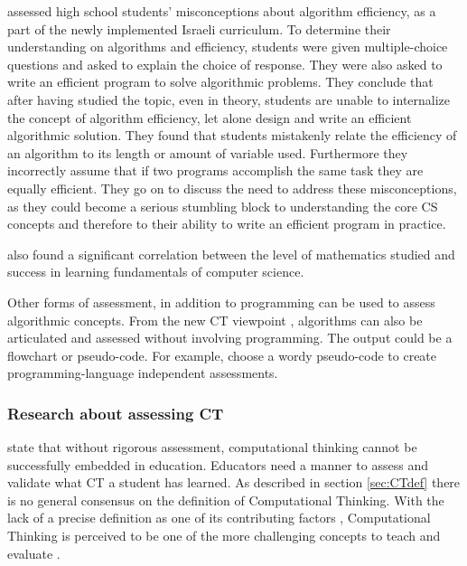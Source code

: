  assessed high school students' misconceptions about algorithm efficiency, as a part of the newly implemented Israeli curriculum. To determine their understanding on algorithms and efficiency, students were given multiple-choice questions and asked to explain the choice of response. They were also asked to write an efficient program to solve algorithmic problems. They conclude that after having studied the topic, even in theory, students are unable to internalize the concept of algorithm efficiency, let alone design and write an efficient algorithmic solution. They found that students mistakenly relate the efficiency of an algorithm to its length or amount of variable used. Furthermore they incorrectly assume that if two programs accomplish the same task they are equally efficient. They go on to discuss the need to address these misconceptions, as they could become a serious stumbling block to understanding the core CS concepts and therefore to their ability to write an efficient program in practice.

\cite{gal2002efficiency} also found a significant correlation between the level of mathematics studied and success in learning fundamentals of computer science.


Other forms of assessment, in addition to programming can be used to assess algorithmic concepts. From the new CT viewpoint \cite{denning2017remaining}, algorithms can also be articulated and assessed without involving programming. The output could be a flowchart \cite{Smetsers2017} or pseudo-code. For example,  choose a wordy pseudo-code to create programming-language independent assessments.


\subsubsection{Research about assessing CT}

 state that without rigorous assessment, computational thinking cannot be successfully embedded in education. Educators need a manner to assess and validate what CT a student has learned. As described in section \ref{sec:CTdef} there is no general consensus on the definition of Computational Thinking. With the lack of a precise definition as one of its contributing factors \cite{crick2017}, Computational Thinking is perceived to be one of the more challenging concepts to teach and evaluate \cite{BrennanResnick2012}.

